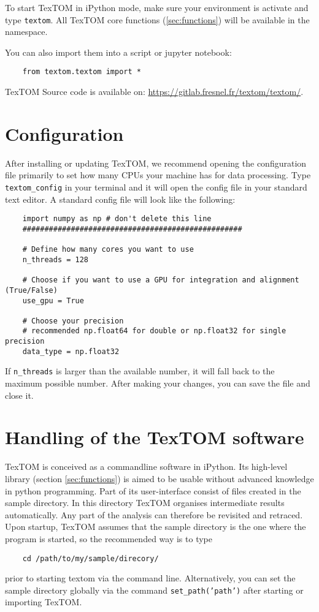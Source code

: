 To start TexTOM in iPython mode, make sure your environment is activate and type \texttt{textom}.
All TexTOM core functions (\ref{sec:functions}) will be available in the namespace.

You can also import them into a script or jupyter notebook:
\begin{verbatim}
    from textom.textom import *
\end{verbatim}

TexTOM Source code is available on:
\url{https://gitlab.fresnel.fr/textom/textom/}.



\newpage
\section{Configuration}
After installing or updating TexTOM, we recommend opening the configuration file primarily to set how many CPUs your machine has
for data processing. Type \texttt{textom\_config} in your terminal and it will open the config file in your standard
text editor. A standard config file will look like the following:
\begin{verbatim}
    import numpy as np # don't delete this line
    ##################################################
    
    # Define how many cores you want to use 
    n_threads = 128 
    
    # Choose if you want to use a GPU for integration and alignment (True/False)
    use_gpu = True
    
    # Choose your precision
    # recommended np.float64 for double or np.float32 for single precision
    data_type = np.float32
\end{verbatim}
If \texttt{n\_threads} is larger than the available number, it will fall back to the maximum possible number.
After making your changes, you can save the file and close it.
\newpage

\section{Handling of the TexTOM software}

TexTOM is conceived as a commandline software in iPython.
Its high-level library (section \ref{sec:functions}) is aimed to be usable without
advanced knowledge in python programming.
Part of its user-interface consist of files created in the sample directory. In this directory
TexTOM organises intermediate results automatically. Any part of the analysis can therefore be
revisited and retraced.
Upon startup, TexTOM assumes that the sample directory is the one where the program is started,
so the recommended way is to type
\begin{verbatim}
    cd /path/to/my/sample/direcory/
\end{verbatim}
prior to starting textom via the command line.
Alternatively, you can set the sample directory globally via the command \texttt{set\_path('path')} 
after starting or importing TexTOM.

